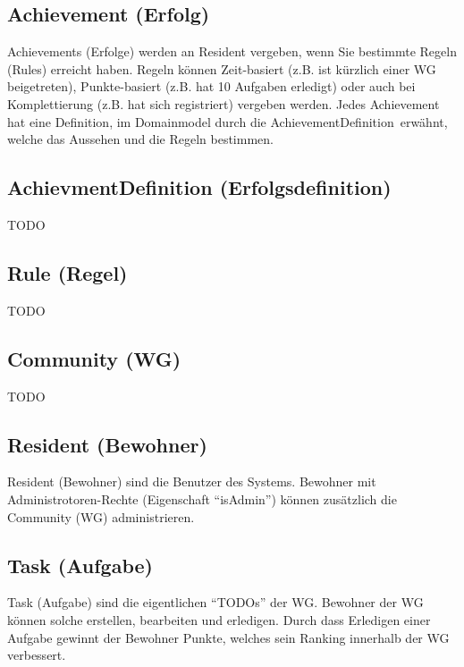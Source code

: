 \subsection*{Achievement (Erfolg)}
Achievements (Erfolge) werden an Resident vergeben, wenn Sie bestimmte Regeln (Rules) erreicht haben. Regeln können Zeit-basiert (z.B. ist kürzlich einer \gls{WG} beigetreten), Punkte-basiert (z.B. hat 10 Aufgaben erledigt) oder auch bei Komplettierung (z.B. hat sich registriert) vergeben werden.
Jedes Achievement hat eine Definition, im Domainmodel durch die \flqq AchievementDefinition\frqq\ erwähnt, welche das Aussehen und die Regeln bestimmen.

\subsection*{AchievmentDefinition (Erfolgsdefinition)}
TODO

\subsection*{Rule (Regel)}
TODO

\subsection*{Community (\gls{WG})}
TODO

\subsection*{Resident (Bewohner)}
Resident (Bewohner) sind die Benutzer des Systems. Bewohner mit Administrotoren-Rechte (Eigenschaft ``isAdmin'') können zusätzlich die Community (\gls{WG}) administrieren.

\subsection*{Task (Aufgabe)}
Task (Aufgabe) sind die eigentlichen ``TODOs'' der \gls{WG}. Bewohner der WG können solche erstellen, bearbeiten und erledigen. Durch dass Erledigen einer Aufgabe gewinnt der Bewohner Punkte, welches sein Ranking innerhalb der WG verbessert.
